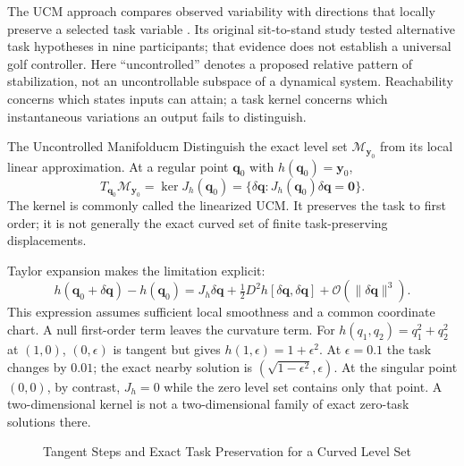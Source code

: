 The UCM approach compares observed variability with directions that locally
preserve a selected task variable \cite{ScholzSchoner1999}.
Its original sit-to-stand study tested alternative task hypotheses in nine
participants; that evidence does not establish a universal golf controller.
Here ``uncontrolled'' denotes a proposed relative pattern of stabilization,
not an uncontrollable subspace of a dynamical system.
Reachability concerns which states inputs can attain; a task kernel concerns
which instantaneous variations an output fails to distinguish.

\begin{definition}{The Uncontrolled Manifold}{ucm}
Distinguish the exact level set $\mathcal M_{\bm y_0}$ from its local linear
approximation. At a regular point $\bm q_0$ with $h(\bm q_0)=\bm y_0$,
\begin{equation}
 T_{\bm q_0}\mathcal M_{\bm y_0}
 =\ker J_h(\bm q_0)
 =\{\delta\bm q:J_h(\bm q_0)\delta\bm q=\bm0\}.
 \label{eq:ch1:ucm-def}
\end{equation}
The kernel is commonly called the linearized UCM.
It preserves the task to first order; it is not generally the exact curved
set of finite task-preserving displacements.
\end{definition}

Taylor expansion makes the limitation explicit:
\begin{equation}
 h(\bm q_0+\delta\bm q)-h(\bm q_0)
 =J_h\delta\bm q+
 \tfrac12 D^2h[\delta\bm q,\delta\bm q]
 +\mathcal O(\|\delta\bm q\|^3).
 \label{eq:ch1:curvature}
\end{equation}
This expression assumes sufficient local smoothness and a common coordinate
chart. A null first-order term leaves the curvature term.
For $h(q_1,q_2)=q_1^2+q_2^2$ at $(1,0)$, $(0,\epsilon)$ is tangent but gives
$h(1,\epsilon)=1+\epsilon^2$.
At $\epsilon=0.1$ the task changes by $0.01$; the exact nearby solution is
$(\sqrt{1-\epsilon^2},\epsilon)$.
At the singular point $(0,0)$, by contrast, $J_h=0$ while the zero level set
contains only that point. A two-dimensional kernel is not a two-dimensional
family of exact zero-task solutions there.

\begin{figure}[htbp]
\centering
{}
\caption{Tangent Steps and Exact Task Preservation for a Curved Level Set}
\label{fig:ch1:dof-illustration}
\end{figure}

